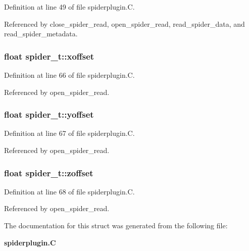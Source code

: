 Definition at line 49 of file spiderplugin.C.

Referenced by close\_\-spider\_\-read, open\_\-spider\_\-read, read\_\-spider\_\-data, and read\_\-spider\_\-metadata.
\subsubsection{\setlength{\rightskip}{0pt plus 5cm}float spider\_\-t::xoffset}\label{structspider__t_m19}




Definition at line 66 of file spiderplugin.C.

Referenced by open\_\-spider\_\-read.
\subsubsection{\setlength{\rightskip}{0pt plus 5cm}float spider\_\-t::yoffset}\label{structspider__t_m20}




Definition at line 67 of file spiderplugin.C.

Referenced by open\_\-spider\_\-read.
\subsubsection{\setlength{\rightskip}{0pt plus 5cm}float spider\_\-t::zoffset}\label{structspider__t_m21}




Definition at line 68 of file spiderplugin.C.

Referenced by open\_\-spider\_\-read.

The documentation for this struct was generated from the following file:\begin{CompactItemize}
\item 
{\bf spiderplugin.C}\end{CompactItemize}
